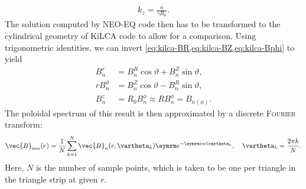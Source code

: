\begin{gather}
  k_{z} = \frac{\bar{n}}{\gamma R_{0}}.
\end{gather}
The solution computed by NEO-EQ code then has to be transformed to the cylindrical geometry of KiLCA code to allow for a comparison. Using trigonometric identities, we can invert \cref{eq:kilca-BR,eq:kilca-BZ,eq:kilca-Bphi} to yield
\begin{align}
  B_{n}^{r} &= B_{n}^{R} \cos \vartheta + B_{n}^{Z} \sin \vartheta, \\
  r B_{n}^{\vartheta} &= B_{n}^{Z} \cos \vartheta - B_{n}^{R} \sin \vartheta, \\
  B_{n}^{z} &= R_{0} B_{n}^{\phi} \approx R B_{n}^{\phi} = B_{n (\phi)}.
\end{align}
The poloidal spectrum of this result is then approximated by a discrete \textsc{Fourier} transform:
\begin{gather}
  \vec{B}_{m n} (r) = \frac{1}{N} \sum_{k = 1}^{N} \vec{B}_{n} (r, \vartheta_{k}) \e^{-\im m \vartheta_{k}}, \quad \vartheta_{k} = \frac{2 \pi k}{N}.
\end{gather}
Here, $N$ is the number of sample points, which is taken to be one per triangle in the triangle strip at given $r$.

